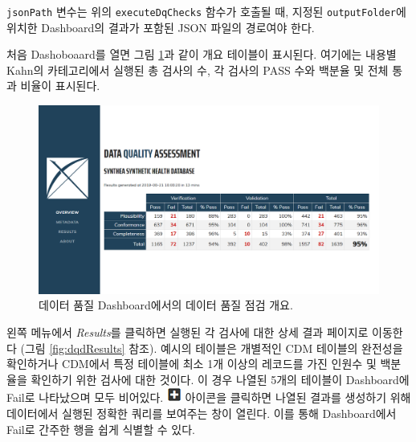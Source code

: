 \documentclass[10.5pt]{book}
\theoremstyle{definition}
\theoremstyle{definition}
\theoremstyle{definition}
\theoremstyle{remark}
\begin{document}
\texttt{jsonPath} 변수는 위의 \texttt{executeDqChecks} 함수가 호출될 때,
지정된 \texttt{outputFolder}에 위치한 Dashboard의 결과가 포함된 JSON
파일의 경로여야 한다.

처음 Dashoboaard를 열면 그림 \ref{fig:dqdOverview}과 같이 개요 테이블이
표시된다. 여기에는 내용별 Kahn의 카테고리에서 실행된 총 검사의 수, 각
검사의 PASS 수와 백분율 및 전체 통과 비율이 표시된다.

\begin{figure}

{\centering \includegraphics[width=1\linewidth]{images/DataQuality/dqdOverview} 

}

\caption{데이터 품질 Dashboard에서의 데이터 품질 점검 개요.}\label{fig:dqdOverview}
\end{figure}

왼쪽 메뉴에서 \emph{Results}를 클릭하면 실행된 각 검사에 대한 상세 결과
페이지로 이동한다 (그림 \ref{fig:dqdResults} 참조). 예시의 테이블은
개별적인 CDM 테이블의 완전성을 확인하거나 CDM에서 특정 테이블에 최소 1개
이상의 레코드를 가진 인원수 및 백분율을 확인하기 위한 검사에 대한
것이다. 이 경우 나열된 5개의 테이블이 Dashboard에 Fail로 나타났으며 모두
비어있다. \includegraphics{images/DataQuality/plusIcon.png} 아이콘을
클릭하면 나열된 결과를 생성하기 위해 데이터에서 실행된 정확한 쿼리를
보여주는 창이 열린다. 이를 통해 Dashboard에서 Fail로 간주한 행을 쉽게
식별할 수 있다.
\end{document}
